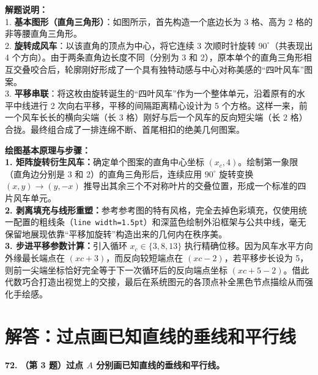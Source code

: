\vspace{0.6cm}

{\small\color{gray}
\textbf{解题说明：}\\
1. \textbf{基本图形（直角三角形）}：如图所示，首先构造一个底边长为 3 格、高为 2 格的非等腰直角三角形。\\
2. \textbf{旋转成风车}：以该直角的顶点为中心，将它连续 3 次顺时针旋转 $90^\circ$（共表现出 4 个方向）。由于两条直角边长度不同（分别为 3 和 2），原本单个的直角三角形相互交叠咬合后，轮廓刚好形成了一个具有独特动感与中心对称美感的“四叶风车”图案。\\
3. \textbf{平移串联}：将这枚由旋转诞生的“四叶风车”作为一个整体单元，沿着原有的水平中线进行 2 次向右平移，平移的间隔距离精心设计为 5 个方格。这样一来，前一个风车长长的横向尖端（长 3 格）刚好与后一个风车的反向短尖端（长 2 格）合拢。最终组合成了一排连绵不断、首尾相扣的绝美几何图案。
}

\vspace{0.6cm}

{\small\color{blue!70!black}
\textbf{绘图基本原理与步骤：}\\
\textbf{1. 矩阵旋转衍生风车：}确定单个图案的直角中心坐标 $(x_c, 4)$。绘制第一象限（直角边分别是 3 和 2）的直角三角形后，连续应用 $90^\circ$ 旋转变换 $(x,y) \to (y,-x)$ 推导出其余三个不对称叶片的交叠位置，形成一个标准的四片风车单元。\\
\textbf{2. 剥离填充与线形重塑：}参考参考图的特有风格，完全去掉色彩填充，仅使用统一配置的粗线条（\texttt{line width=1.5pt}）和深蓝色绘制外沿框架与公共中线，毫无保留地展现依靠“平移加旋转”构造出来的几何内在秩序美。\\
\textbf{3. 步进平移参数计算：}引入循环 $x_c \in \{3, 8, 13\}$ 执行精确位移。因为风车水平方向外缘最长端点在 $(xc+3)$，而反向较短端点在 $(xc-2)$，若平移步长设为 5，则前一尖端坐标恰好完全等于下一次循环后的反向端点坐标 $(xc+5-2)$。借此代数巧合打造出视觉上的交接，最后在系统图元的各顶点补全黑色节点描绘从而强化手绘感。
}

\newpage



\section{解答：过点画已知直线的垂线和平行线}

\vspace{0.6cm}

\textbf{\LARGE 72.} \textbf{（第 3 题）过点 $A$ 分别画已知直线的垂线和平行线。}

